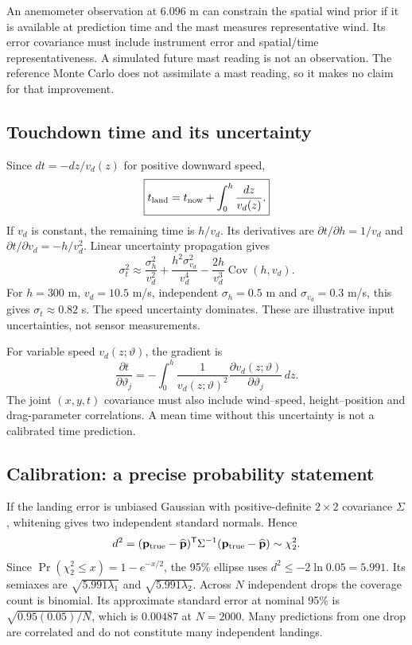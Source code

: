 An anemometer observation at 6.096 m can constrain the spatial wind prior if it is available at prediction time and the mast measures representative wind. Its error covariance must include instrument error and spatial/time representativeness. A simulated future mast reading is not an observation. The reference Monte Carlo does not assimilate a mast reading, so it makes no claim for that improvement.

\subsection{Touchdown time and its uncertainty}
Since $dt=-dz/v_d(z)$ for positive downward speed,
\begin{equation}
 \boxed{t_{\rm land}=t_{\rm now}+\int_0^h\frac{dz}{v_d(z)}.}
\end{equation}
If $v_d$ is constant, the remaining time is $h/v_d$. Its derivatives are $\partial t/\partial h=1/v_d$ and $\partial t/\partial v_d=-h/v_d^2$. Linear uncertainty propagation gives
\begin{equation}
 \sigma_t^2\approx\frac{\sigma_h^2}{v_d^2}+\frac{h^2\sigma_{v_d}^2}{v_d^4}
 -\frac{2h}{v_d^3}\operatorname{Cov}(h,v_d).
\end{equation}
For $h=300$ m, $v_d=10.5$ m/s, independent $\sigma_h=0.5$ m and $\sigma_{v_d}=0.3$ m/s, this gives $\sigma_t\approx0.82$ s. The speed uncertainty dominates. These are illustrative input uncertainties, not sensor measurements.

For variable speed $v_d(z;\vartheta)$, the gradient is
\begin{equation}
 \frac{\partial t}{\partial\vartheta_j}
 =-\int_0^h\frac{1}{v_d(z;\vartheta)^2}
 \frac{\partial v_d(z;\vartheta)}{\partial\vartheta_j}\,dz.
\end{equation}
The joint $(x,y,t)$ covariance must also include wind--speed, height--position and drag-parameter correlations. A mean time without this uncertainty is not a calibrated time prediction.

\subsection{Calibration: a precise probability statement}
If the landing error is unbiased Gaussian with positive-definite $2\times2$ covariance $\Sigma$, whitening gives two independent standard normals. Hence
\begin{equation}
 d^2=(\mathbf p_{\rm true}-\widehat{\mathbf p})^{\mathsf T}\Sigma^{-1}
 (\mathbf p_{\rm true}-\widehat{\mathbf p})\sim\chi^2_2.
\end{equation}
Since $\Pr(\chi^2_2\leq x)=1-e^{-x/2}$, the 95\% ellipse uses $d^2\leq-2\ln0.05=5.991$. Its semiaxes are $\sqrt{5.991\lambda_1}$ and $\sqrt{5.991\lambda_2}$. Across $N$ independent drops the coverage count is binomial. Its approximate standard error at nominal 95\% is $\sqrt{0.95(0.05)/N}$, which is $0.00487$ at $N=2000$. Many predictions from one drop are correlated and do not constitute many independent landings.

